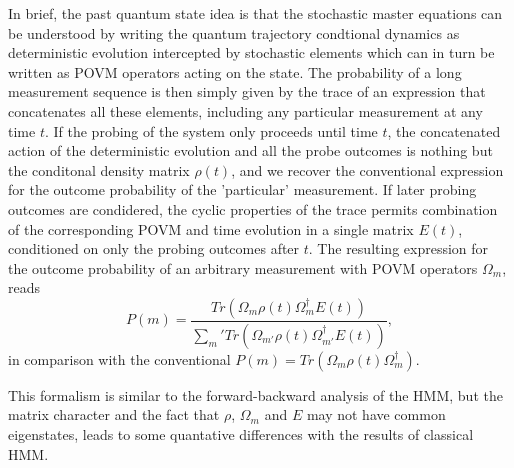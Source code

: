 \documentclass[aps,pra,twocolumn,groupedaddress,showpacs]{revtex4}
\begin{document}
In brief, the past quantum state idea is that the stochastic master equations can be understood by writing the quantum trajectory condtional dynamics as  deterministic evolution intercepted by stochastic elements which can in turn be written as POVM operators acting on the state. The probability of a long measurement sequence is then simply given by the trace of an expression that concatenates all these elements, including any particular measurement at any time $t$. If the probing of the system only proceeds until time $t$, the concatenated action of the deterministic evolution and all the probe outcomes is nothing but the conditonal density matrix $\rho(t)$, and we recover the conventional expression for the outcome probability of the 'particular' measurement. If later probing outcomes are condidered, the cyclic properties of the trace permits combination of the corresponding POVM and time evolution in a single matrix $E(t)$, conditioned on only the probing outcomes after $t$. The resulting expression for the outcome probability of an arbitrary measurement with POVM operators $\Omega_m$, reads
\begin{equation} \label{pqsprob}
P(m)=\frac{Tr(\Omega_m \rho(t)\Omega_m^{\dag} E(t))}
{\sum_m' Tr(\Omega_{m'} \rho(t)\Omega_{m'}^{\dag} E(t))}, 
\end{equation}
in comparison with the conventional $P(m)=Tr(\Omega_m \rho(t)\Omega_m^{\dag})$. 

This formalism is similar to the forward-backward analysis of the HMM, but the matrix character and the fact that $\rho$, $\Omega_m$ and $E$ may not have common eigenstates, leads to some quantative differences with the results of classical HMM.
\end{document}
